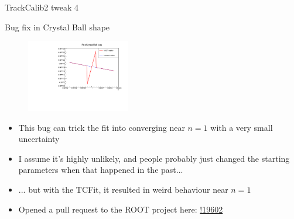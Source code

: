 \documentclass[xcolor={dvipsnames}]{beamer}
\begin{document}
\begin{frame}{TrackCalib2 tweak 4}
  \vspace{0.0cm}
  \begin{center}
    {\large Bug fix in Crystal Ball shape}
  \end{center}
  \vspace{0.0cm}
  \begin{figure}[htb]
    \centering
    \includegraphics[width=0.4\textwidth]{Plots/RooCrystalBall_fix.pdf}
  \end{figure}
  \vspace{-0.5cm}
  \begin{itemize}
    \setlength\itemsep{0.0em}
    \item{This bug can trick the fit into converging near $n = 1$ with a very small uncertainty}
    \item{I assume it's highly unlikely, and people probably just changed the starting parameters when that happened in the past...}
    \item{... but with the TCFit, it resulted in weird behaviour near $n = 1$}
    \item{Opened a pull request to the ROOT project here: \href{https://github.com/root-project/root/pull/19602}{!19602}}
  \end{itemize}
\end{frame}
\end{document}
